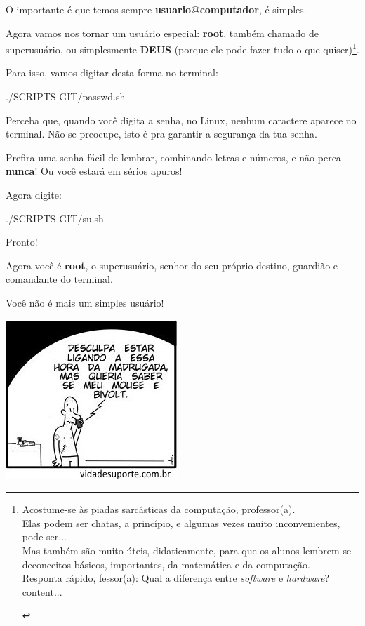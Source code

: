 \begin{multicols}{2}
O importante é que temos sempre \textbf{usuario@computador}, é simples.

Agora vamos nos tornar um usuário especial: \textbf{root}, também chamado de superusuário, ou simplesmente \textbf{DEUS} (porque ele pode fazer tudo o que quiser)\footnote{\begin{multicols}{2}{Acostume-se às piadas sarcásticas da computação, professor(a).\\Elas podem ser chatas, a princípio, e algumas vezes muito inconvenientes, pode ser...\\Mas também são muito úteis, didaticamente, para que os alunos lembrem-se de\nobreak  conceitos básicos, importantes, da matemática e da computação.\\Responta rápido, fessor(a): Qual a diferença entre \textit{software} e \textit{hardware}?}
		content...
\end{multicols}}.

Para isso, vamos digitar desta forma no terminal:

	
{./SCRIPTS-GIT/passwd.sh}

Perceba que, quando você digita a senha, no Linux, nenhum caractere aparece no terminal. Não se preocupe, isto é pra garantir a segurança da tua senha.

Prefira uma senha fácil de lembrar, combinando letras e números, e não perca \textbf{nunca}! Ou você estará em sérios apuros!

Agora digite:

	
{./SCRIPTS-GIT/su.sh}

Pronto!

Agora você é \textbf{root}, o superusuário, senhor do seu próprio destino, guardião e comandante do terminal.

Você não é mais um simples usuário!

\begin{center}
	\includegraphics[width=.4\linewidth]{./IMG-GIT/Suporte_643.jpg}
\end{center}	


\end{multicols}
